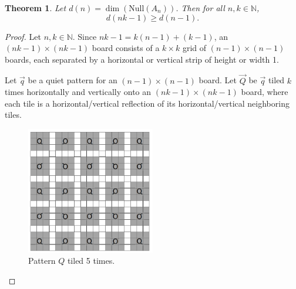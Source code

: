 \documentclass[a4paper]{article}
\newtheorem{theorem}{Theorem}
\newcommand{\N}{\mathbb{N}}
\begin{document}
	\begin{theorem}\label{tiling-quiet-patterns}
		Let $d(n) = \dim(\text{Null}(A_n))$.
		Then for all $n,k \in \N$,
		\begin{equation*}
			d(nk - 1) \geq d(n-1).
		\end{equation*}
	\end{theorem}
	\begin{proof}
		Let $n,k \in \N$.
		Since $nk - 1 = k(n-1) + (k-1)$, an $(nk-1) \times (nk-1)$ board consists of a $k \times k$ grid of $(n-1) \times (n-1)$ boards, each separated by a horizontal or vertical strip of height or width 1.
	
		Let $\vec{q}$ be a quiet pattern for an $(n-1) \times (n-1)$ board.
		Let $\vec{Q}$ be $\vec{q}$ tiled $k$ times horizontally and vertically onto an $(nk-1) \times (nk-1)$ board, where each tile is a horizontal/vertical reflection of its horizontal/vertical neighboring tiles.
		
		\begin{figure}[H]
			\centering
%				
%				
%						
			\includegraphics[width=0.5\textwidth]{tiling_q.png}
			\caption{Pattern $Q$ tiled 5 times.}	
		\end{figure}
	

\end{proof}
\end{document}
